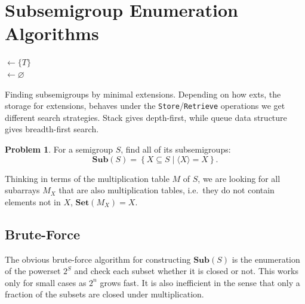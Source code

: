 \documentclass{amsart}
\newcommand{\Sub}{\mathbf{Sub}}
\newcommand{\Set}{\mathbf{Set}}
\theoremstyle{plain}
\theoremstyle{definition}
\newtheorem{problem}[theorem]{Problem}
\begin{document}
\section{Subsemigroup Enumeration Algorithms}
\label{sec:enum}
\begin{algorithm}[t]
\BlankLine
\Name{}
\subs $\leftarrow \{T\}$\\
\exts $\leftarrow \varnothing$\\
\Return \subs
\caption{Finding subsemigroups by minimal extensions. Depending on how \textsf{exts}, the storage for extensions, behaves under the \texttt{Store}/\texttt{Retrieve} operations we get different search strategies. Stack gives depth-first, while queue data structure gives breadth-first search.}
\label{alg:minclosure}
\end{algorithm}

\begin{problem}
For a semigroup $S$, find all of its subsemigroups:
$$\Sub(S)=\left\{ X\subseteq S\mid \langle X\rangle=X\right\}.$$
\end{problem}
Thinking in terms of the multiplication table $M$ of $S$, we are looking for all subarrays $M_X$ that are also multiplication tables, i.e.\ they do not contain elements not in $X$, $\Set(M_X)=X$.

\subsection{Brute-Force}
The obvious brute-force algorithm for constructing $\Sub(S)$ is the enumeration of the powerset $2^S$ and check each subset whether it is closed or not.
This works only for small cases as $2^n$ grows fast.
It is also inefficient in the sense that only a fraction of the subsets are closed under multiplication.
 
\end{document}
